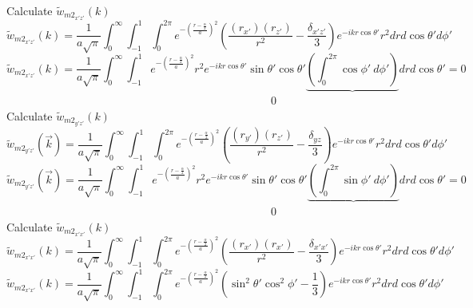 \documentclass[letterpaper,twocolumn,amsmath,amssymb,prb]{revtex4-1}
\begin{document}
\begin{widetext}
Calculate $\widetilde{w}_{{m2}_{x'z'}}(k)$ 
\begin{equation}{\widetilde{w}_{{m2}_{x'z'}}(k)=\frac{1}{a\sqrt{\pi}}\int_{0}^{\infty}\int_{-1}^{1}\int_{0}^{2\pi}e^{-\left(\frac{r-\frac{\alpha}{2}}{a}\right)^2}\left(\frac{(r_{x'})(r_{z'})}{r^2}-\frac{\delta_{x'z'}}{3}\right)e^{-ikr\cos\theta'}r^2d{r}d{\cos\theta'}d{\phi'}}\end{equation}
\begin{equation}{\widetilde{w}_{{m2}_{x'z'}}(k)=\frac{1}{a\sqrt{\pi}}\int_{0}^{\infty}\int_{-1}^{1}e^{-\left(\frac{r-\frac{\alpha}{2}}{a}\right)^2}r^2e^{-ikr\cos\theta'}\sin\theta'\cos\theta'\underbrace{\left(\int_{0}^{2\pi}\cos\phi'~d{\phi'}\right)}d{r}d{\cos\theta'}=0}\end{equation}
$~~~~~~~~~~~~~~~~~~~~~~~~~~~~~~~~~~~~~~~~~~~~~~~~~~~~~~~~~~~~~~~~~~~~~~~~~~~~~~~~~~~~~~~~~~~~~~~~~~~~~~~~~~~0$
\[{}\]
Calculate $\widetilde{w}_{{m2}_{y'z'}}(k)$ 
\begin{equation}{\widetilde{w}_{{m2}_{y'z'}}(\vec{k})=\frac{1}{a\sqrt{\pi}}\int_{0}^{\infty}\int_{-1}^{1}\int_{0}^{2\pi}e^{-\left(\frac{r-\frac{\alpha}{2}}{a}\right)^2}\left(\frac{(r_{y'})(r_{z'})}{r^2}-\frac{\delta_{yz}}{3}\right)e^{-ikr\cos\theta'}r^2d{r}d{\cos\theta'}d{\phi'}}\end{equation}
\begin{equation}{\widetilde{w}_{{m2}_{y'z'}}(\vec{k})=\frac{1}{a\sqrt{\pi}}\int_{0}^{\infty}\int_{-1}^{1}e^{-\left(\frac{r-\frac{\alpha}{2}}{a}\right)^2}r^2e^{-ikr\cos\theta'}\sin\theta'\cos\theta'\underbrace{\left(\int_{0}^{2\pi}\sin\phi'~d{\phi'}\right)}d{r}d{\cos\theta'}=0}\end{equation}
$~~~~~~~~~~~~~~~~~~~~~~~~~~~~~~~~~~~~~~~~~~~~~~~~~~~~~~~~~~~~~~~~~~~~~~~~~~~~~~~~~~~~~~~~~~~~~~~~~~~~~~~~~~~0$
\[{}\]
Calculate $\widetilde{w}_{{m2}_{x'x'}}(k)$ 
\begin{equation}{\widetilde{w}_{{m2}_{x'x'}}(k)=\frac{1}{a\sqrt{\pi}}\int_{0}^{\infty}\int_{-1}^{1}\int_{0}^{2\pi}e^{-\left(\frac{r-\frac{\alpha}{2}}{a}\right)^2}\left(\frac{(r_{x'})(r_{x'})}{r^2}-\frac{\delta_{x'x'}}{3}\right)e^{-ikr\cos\theta'}r^2d{r}d{\cos\theta'}d{\phi'}}\end{equation}
\begin{equation}{\widetilde{w}_{{m2}_{x'x'}}(k)=\frac{1}{a\sqrt{\pi}}\int_{0}^{\infty}\int_{-1}^{1}\int_{0}^{2\pi}e^{-\left(\frac{r-\frac{\alpha}{2}}{a}\right)^2}\left(\sin^2\theta'\cos^2\phi'-\frac{1}{3}\right)e^{-ikr\cos\theta'}r^2d{r}d{\cos\theta'}d{\phi'}}\end{equation}
\[{}\]

\end{widetext}
\end{document}
